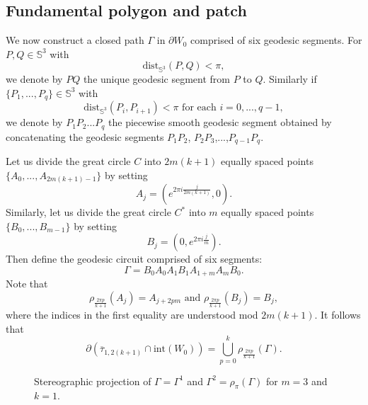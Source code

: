 \documentclass[11pt, reqno]{amsart}
\numberwithin{equation}{section}
\begin{document}
\subsection{Fundamental polygon and patch}
We now construct a closed path $\Gamma$ in $\partial W_0$ comprised of six geodesic segments.  For $P,Q\in\mathbb{S}^3$ with \begin{equation}\mbox{dist}_{\mathbb{S}^3}(P,Q)<\pi,\end{equation} we denote by $PQ$ the unique geodesic segment from $P$ to $Q$.  Similarly if $\{P_1,...,P_q\}\in\mathbb{S}^3$ with 
\begin{equation}\mbox{dist}_{\mathbb{S}^3}(P_i,P_{i+1})<\pi\mbox{ for each } i=0,...,q-1,\end{equation} 
we denote by $P_1P_2...P_q$ the piecewise smooth geodesic segment obtained by concatenating the geodesic segments $P_1P_2$, $P_2P_3$,...,$P_{q-1}P_q$.



Let us divide the great circle $C$ into $2m(k+1)$ equally spaced points $\{A_0,...,A_{2m(k+1)-1}\}$ by setting 
\begin{equation}
A_j=(e^{2\pi i\frac{j}{2m(k+1)}},0).
\end{equation}
Similarly, let us divide the great circle $C^*$ into $m$ equally spaced points $\{B_0,...,B_{m-1}\}$ by setting
\begin{equation}
B_j = (0,e^{2\pi i\frac{ j}{m}}).
\end{equation}  
Then define the geodesic circuit comprised of six segments:
\begin{equation}
\Gamma=B_0A_0A_1 B_1 A_{1+m} A_{m}B_0.
\end{equation}
Note that  \begin{equation}\label{pointrotate}\rho_{\frac{2 \pi p}{k+1}}(A_j)=A_{j+2pm}\mbox{ and } \rho_{\frac{2 \pi p}{k+1}}(B_j)=B_j,\end{equation} where the indices in the first equality are understood mod $2m(k+1)$.
It follows that
\begin{equation}\label{howtau}
\partial(\overline{\tau}_{1,2(k+1)}\cap\mbox{int}(W_0)) = \bigcup_{p=0}^{k} \rho_{\frac{2\pi p}{k+1}}( \Gamma).
\end{equation}

    \begin{figure}
	\centering
	\resizebox{3in}{!}{}
	\caption{Stereographic projection of $\Gamma=\Gamma^1$ and $\Gamma^2=\rho_{\pi}(\Gamma) $  for $m=3$ and $k=1$.}
	\label{GammaFig}
\end{figure}
\end{document}
